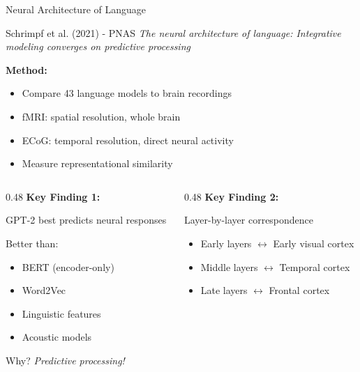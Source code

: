 \documentclass[aspectratio=169]{beamer}
\begin{document}
\begin{frame}{Neural Architecture of Language 🔬}
\begin{block}{Schrimpf et al. (2021) - PNAS}
\textit{The neural architecture of language: Integrative modeling converges on predictive processing}
\end{block}

\vspace{0.5em}

\textbf{Method:}
\begin{itemize}
    \item Compare 43 language models to brain recordings
    \item fMRI: spatial resolution, whole brain
    \item ECoG: temporal resolution, direct neural activity
    \item Measure representational similarity
\end{itemize}

\vspace{0.5em}

\begin{columns}[T]
\begin{column}{0.48\textwidth}
\textbf{Key Finding 1:}

\alert{GPT-2 best predicts neural responses}

\vspace{0.3em}

Better than:
\begin{itemize}
    \item BERT (encoder-only)
    \item Word2Vec
    \item Linguistic features
    \item Acoustic models
\end{itemize}

\vspace{0.3em}

Why? \textit{Predictive processing!}
\end{column}

\begin{column}{0.48\textwidth}
\textbf{Key Finding 2:}

\alert{Layer-by-layer correspondence}

\vspace{0.3em}

\begin{itemize}
    \item Early layers $\leftrightarrow$ Early visual cortex
    \item Middle layers $\leftrightarrow$ Temporal cortex
    \item Late layers $\leftrightarrow$ Frontal cortex
\end{itemize}


\end{column}
\end{columns}
\end{frame}
\end{document}
